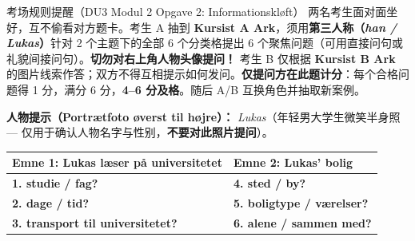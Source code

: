 \begin{tipbox}{考场规则提醒（DU3 Modul 2 Opgave 2: Informationskløft）}
\small
两名考生面对面坐好，互不偷看对方题卡。考生 A 抽到 \textbf{Kursist A Ark}，须用\textbf{第三人称（\textit{han / Lukas}）}针对 2 个主题下的全部 6 个分类格提出 6 个聚焦问题（可用直接问句或礼貌间接问句）。\textbf{切勿对右上角人物头像提问！} 考生 B 仅根据 \textbf{Kursist B Ark} 的图片线索作答；双方不得互相提示如何发问。\textbf{仅提问方在此题计分}：每个合格问题得 1 分，满分 6 分，\textbf{4--6 分及格}。随后 A/B 互换角色并抽取新案例。
\end{tipbox}

\begin{tcolorbox}[enhanced, breakable, colback=NCDBgGray, colframe=NCDNavy, coltitle=white, fonttitle=\bfseries, title={Kursist A Ark --- Case: Lukas（提问方题卡 · 含 6 个视觉问号格）}, arc=2pt, boxrule=0.8pt, left=10pt, right=10pt, top=7pt, bottom=7pt]
\small
\textbf{人物提示（Portrætfoto øverst til højre）：} \textit{Lukas}（年轻男大学生微笑半身照 --- 仅用于确认人物名字与性别，\textbf{不要对此照片提问}）。

\vspace{0.4em}
\renewcommand{\arraystretch}{1.35}
\begin{tabularx}{\linewidth}{@{} >{\raggedright\arraybackslash}p{8.0cm} >{\raggedright\arraybackslash}X @{}}
\toprule
\textbf{\color{NCDNavy}Emne 1: Lukas læser på universitetet} & \textbf{\color{NCDNavy}Emne 2: Lukas’ bolig} \\
\midrule
\textbf{1. studie / fag} \quad \textbf{\color{NCDRed}?}
&
\textbf{4. sted / by} \quad \textbf{\color{NCDRed}?}
\\
\midrule
\textbf{2. dage / tid} \quad \textbf{\color{NCDRed}?}
&
\textbf{5. boligtype / værelser} \quad \textbf{\color{NCDRed}?}
\\
\midrule
\textbf{3. transport til universitetet} \quad \textbf{\color{NCDRed}?}
&
\textbf{6. alene / sammen med} \quad \textbf{\color{NCDRed}?}
\\
\bottomrule
\end{tabularx}
\end{tcolorbox}

